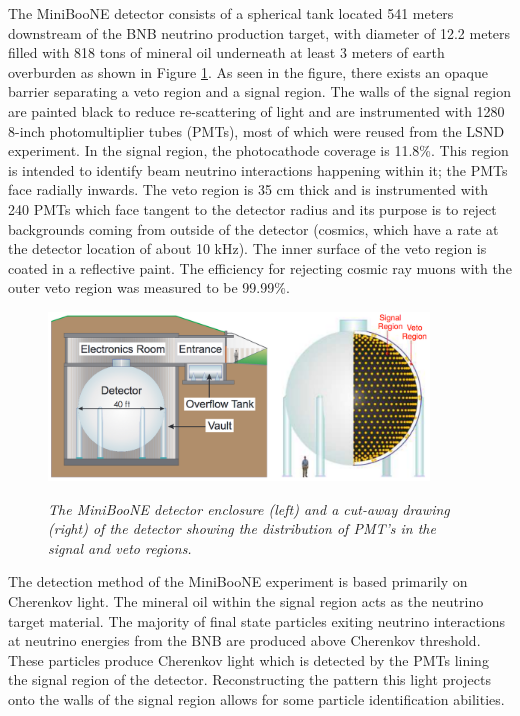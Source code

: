 The MiniBooNE detector \cite{MBDetectorPaper} consists of a spherical tank located 541 meters downstream of the BNB neutrino production target, with diameter of 12.2 meters filled with 818 tons of mineral oil underneath at least 3 meters of earth overburden as shown in Figure \ref{MB_detector_fig}. As seen in the figure, there exists an opaque barrier separating a veto region and a signal region. The walls of the signal region are painted black to reduce re-scattering of light and are instrumented with 1280 8-inch photomultiplier tubes (PMTs), most of which were reused from the LSND experiment. In the signal region, the photocathode coverage is 11.8\%. This region is intended to identify beam neutrino interactions happening within it; the PMTs face radially inwards. The veto region is 35 cm thick and is instrumented with 240 PMTs which face tangent to the detector radius and its purpose is to reject backgrounds coming from outside of the detector (cosmics, which have a rate at the detector location of about 10 kHz). The inner surface of the veto region is coated in a reflective paint. The efficiency for rejecting cosmic ray muons with the outer veto region was measured to be 99.99\%.\\

\begin{figure}[ht!]
\centering
	\includegraphics[width=0.9\textwidth]{Figures/MB_detectorpaper_fig.png} \\
\caption{\textit{The MiniBooNE detector enclosure (left) and a cut-away drawing (right) of the detector showing the distribution of PMT's in the signal and veto regions.}}\label{MB_detector_fig}
\end{figure}

The detection method of the MiniBooNE experiment is based primarily on Cherenkov light. The mineral oil within the signal region acts as the neutrino target material. The majority of final state particles exiting neutrino interactions at neutrino energies from the BNB are produced above Cherenkov threshold. These particles produce Cherenkov light which is detected by the PMTs lining the signal region of the detector. Reconstructing the pattern this light projects onto the walls of the signal region allows for some particle identification abilities.\\

